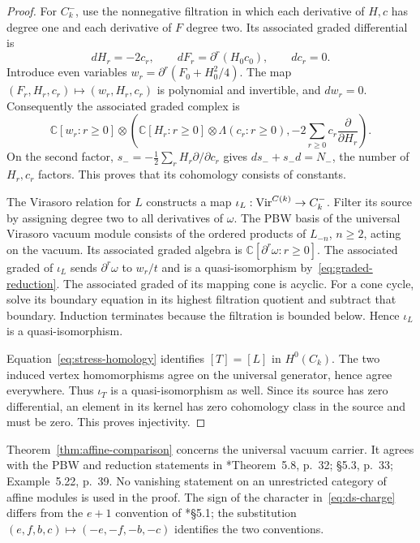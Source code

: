 \begin{proof}
For $C_k^-$, use the nonnegative filtration in which each derivative of $H,c$ has degree one and each derivative of $F$ degree two.
Its associated graded differential is
\[
 dH_r=-2c_r,\qquad dF_r=\partial^r(H_0c_0),\qquad dc_r=0.
\]
Introduce even variables $w_r=\partial^r(F_0+H_0^2/4)$.
The map $(F_r,H_r,c_r)\mapsto(w_r,H_r,c_r)$ is polynomial and invertible, and $dw_r=0$.
Consequently the associated graded complex is
\begin{equation}\label{eq:graded-reduction}
 \mathbb C[w_r:r\geq0]\otimes
 \left(\mathbb C[H_r:r\geq0]\otimes\Lambda(c_r:r\geq0),
       -2\sum_{r\geq0}c_r\frac{\partial}{\partial H_r}\right).
\end{equation}
On the second factor, $s_-=-\frac12\sum_rH_r\partial/\partial c_r$ gives
$ds_-+s_-d=N_-$, the number of $H_r,c_r$ factors.
This proves that its cohomology consists of constants.

The Virasoro relation for $L$ constructs a map $\iota_L:\operatorname{Vir}^{C(k)}\to C_k^-$.
Filter its source by assigning degree two to all derivatives of $\omega$.
The PBW basis of the universal Virasoro vacuum module consists of the ordered products of $L_{-n}$, $n\geq2$, acting on the vacuum.
Its associated graded algebra is $\mathbb C[\partial^r\omega:r\geq0]$.
The associated graded of $\iota_L$ sends $\partial^r\omega$ to $w_r/t$ and is a quasi-isomorphism by~\eqref{eq:graded-reduction}.
The associated graded of its mapping cone is acyclic.
For a cone cycle, solve its boundary equation in its highest filtration quotient and subtract that boundary.
Induction terminates because the filtration is bounded below.
Hence $\iota_L$ is a quasi-isomorphism.

Equation~\eqref{eq:stress-homology} identifies $[T]=[L]$ in $H^0(C_k)$.
The two induced vertex homomorphisms agree on the universal generator, hence agree everywhere.
Thus $\iota_T$ is a quasi-isomorphism as well.
Since its source has zero differential, an element in its kernel has zero cohomology class in the source and must be zero.
This proves injectivity.
\end{proof}

Theorem~\ref{thm:affine-comparison} concerns the universal vacuum carrier.
It agrees with the PBW and reduction statements in \cite{AffineDSArakawa026}*{Theorem~5.8, p.~32; \S5.3, p.~33; Example~5.22, p.~39}.
No vanishing statement on an unrestricted category of affine modules is used in the proof.
The sign of the character in~\eqref{eq:ds-charge} differs from the $e+1$ convention of \cite{AffineDSArakawa026}*{\S5.1}; the substitution $(e,f,b,c)\mapsto(-e,-f,-b,-c)$ identifies the two conventions.

